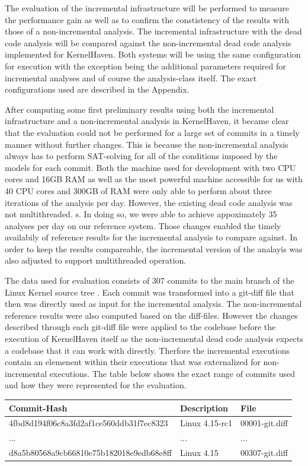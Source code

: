 \documentclass[a4paper]{article}
\begin{document}
The evaluation of the incremental infrastructure will be performed to measure the performance gain as well as to confirm the constistency of the results with those of a non-incremental analysis. The incremental infrastructure with the dead code analysis will be compared against the non-incremental dead code analysis implemented for KernelHaven. Both systems will be using the same configuration for execution with the exception being the additional parameters required for incremental analyses and of course the analysis-class itself. The exact configurations used are described in the Appendix.

After computing some first preliminary results using both the incremental infrastructure and a non-incremental analysis in KernelHaven, it became clear that the evaluation could not be performed for a large set of commits in a timely manner without further changes. This is because the non-incremental analysis always has to perform SAT-solving for all of the conditions imposed by the models for each commit. Both the machine used for development with two CPU cores and 16GB RAM as well as the most powerful machine accessible for us with 40 CPU cores and 300GB of RAM were only able to perform about three iterations of the analysis per day. However, the existing dead code analysis was not multithreaded.  s. In doing so, we were able to achieve appoximately 35 analyses per day on our reference system. Those changes enabled the timely availabily of reference results for the incremental analysis to compare against. In order to keep the results compareable, the incremental version of the analayis was also adjusted to support multithreaded operation. 

The data used for evaluation consists of 307 commits to the main branch of the Linux Kernel source tree \cite{linux}. Each commit was transformed into a git-diff file that then was directly used as input for the incremental analysis. The non-incremental reference results were also computed based on the diff-files. However the changes described through each git-diff file were applied to the codebase before the execution of KernelHaven itself as the non-incremental dead code analysis expects a codebase that it can work with directly. Therfore the incremental executions contain an elemenent within their executions that was externalized for non-incremental executions. The table below shows the exact range of commits used and how they were represented for the evaluation.

\begin{tabular}{l | l | l}
	Commit-Hash & Description & File \\ \hline
	4fbd8d194f06c8a3fd2af1ce560ddb31f7ec8323 & Linux 4.15-rc1 & 00001-git.diff \\
	... & ... & ... \\
	d8a5b80568a9cb66810e75b182018e9edb68e8ff & Linux 4.15  & 00307-git.diff \\
\end{tabular}
\end{document}
